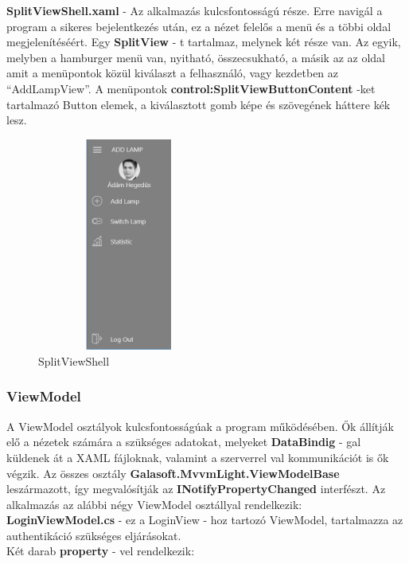 \documentclass[a4paper,12pt]{report}
\begin{document}
    \textbf{SplitViewShell.xaml} - Az alkalmazás kulcsfontosságú része. Erre navigál a program a sikeres bejelentkezés után, ez a nézet
    felelős a menü és a többi oldal megjelenítéséért. Egy \textbf{SplitView} - t tartalmaz, melynek két része van. Az egyik, melyben a hamburger
    menü van, nyitható, összecsukható, a másik az az oldal amit a menüpontok közül kiválaszt a felhasználó, vagy kezdetben az ``AddLampView''.
    A menüpontok \textbf{control:SplitViewButtonContent} -ket tartalmazó Button elemek, a kiválasztott gomb képe és szövegének háttere kék lesz.

\begin{figure}[H]
    \centering
    \includegraphics[width=6cm,height=7cm,keepaspectratio]{images/hamburgermenu.jpg}
    \caption{SplitViewShell}
    \label{fig: SplitViewShell}
\end{figure}

\subsubsection{ViewModel}
    A ViewModel osztályok kulcsfontosságúak a program működésében. Ők állítják elő a nézetek számára a szükséges adatokat, melyeket \textbf{DataBindig} - gal
    küldenek át a XAML fájloknak, valamint a szerverrel val kommunikációt is ők végzik. Az összes osztály \textbf{Galasoft.MvvmLight.ViewModelBase} leszármazott, így
    megvalósítják az \textbf{INotifyPropertyChanged} interfészt. Az alkalmazás az alábbi négy ViewModel osztállyal rendelkezik:\\

    \textbf{LoginViewModel.cs} - ez a LoginView - hoz tartozó ViewModel, tartalmazza az authentikáció szükséges eljárásokat. \\

    Két darab \textbf{property} - vel rendelkezik:
\end{document}
